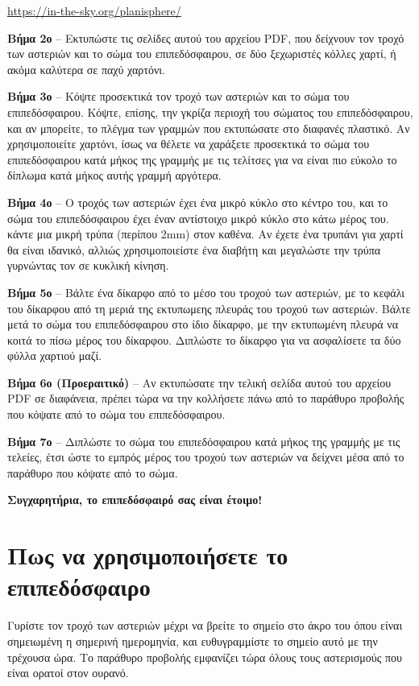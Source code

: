 \documentclass[a4paper,onecolumn,10pt]{article}
\begin{document}
\url{https://in-the-sky.org/planisphere/}

{\bf Βήμα 2ο} -- Εκτυπώστε τις σελίδες αυτού του αρχείου PDF, που δείχνουν τον
τροχό των αστεριών και το σώμα του επιπεδόσφαιρου, σε δύο ξεχωριστές κόλλες χαρτί,
ή ακόμα καλύτερα σε παχύ χαρτόνι.

{\bf Βήμα 3ο} -- Κόψτε προσεκτικά τον τροχό των αστεριών και το σώμα του
επιπεδόσφαιρου. Κόψτε, επίσης, την γκρίζα περιοχή του σώματος του επιπεδόσφαιρου, και
αν μπορείτε, το πλέγμα των γραμμών που εκτυπώσατε στο διαφανές πλαστικό. 
Αν χρησιμοποιείτε χαρτόνι, ίσως να θέλετε να χαράξετε προσεκτικά το σώμα
του επιπεδόσφαιρου κατά μήκος της γραμμής με τις τελίτσες για να είναι πιο εύκολο το δίπλωμα
κατά μήκος αυτής γραμμή αργότερα.

{\bf Βήμα 4ο} -- Ο τροχός των αστεριών έχει ένα μικρό κύκλο στο κέντρο του, και το σώμα 
του επιπεδόσφαιρου έχει έναν αντίστοιχο μικρό κύκλο στο κάτω μέρος του. κάντε μια μικρή τρύπα
(περίπου 2mm) στον καθένα. Αν έχετε ένα τρυπάνι για χαρτί θα είναι ιδανικό,
αλλιώς χρησιμοποιείστε ένα διαβήτη και μεγαλώστε την τρύπα γυρνώντας τον σε κυκλική κίνηση.

{\bf Βήμα 5ο} -- Βάλτε ένα δίκαρφο από το μέσο του τροχού των αστεριών, 
με το κεφάλι του δίκαρφου από τη μεριά της εκτυπωμεης πλευράς του τροχού των αστεριών. 
Βάλτε μετά το σώμα του επιπεδόσφαιρου στο ίδιο δίκαρφο, με την εκτυπωμένη πλευρά
να κοιτά το πίσω μέρος του δίκαρφου. Διπλώστε το δίκαρφο για να ασφαλίσετε τα 
δύο φύλλα χαρτιού μαζί.

{\bf Βήμα 6ο (Προεραιτικό)} -- Αν εκτυπώσατε την τελική σελίδα αυτού του αρχείου PDF
σε διαφάνεια, πρέπει τώρα να την κολλήσετε πάνω από το παράθυρο προβολής
που κόψατε από το σώμα του επιπεδόσφαιρου.

{\bf Βήμα 7ο} -- Διπλώστε το σώμα του επιπεδόσφαιρου κατά μήκος της γραμμής με τις τελείες,
έτσι ώστε το εμπρός μέρος του τροχού των αστεριών να δείχνει μέσα από το παράθυρο που κόψατε 
από το σώμα.

{\bf Συγχαρητήρια, το επιπεδόσφαιρό σας είναι έτοιμο!}

\section*{Πως να χρησιμοποιήσετε το επιπεδόσφαιρο}

Γυρίστε τον τροχό των αστεριών μέχρι να βρείτε το σημείο στο άκρο του όπου είναι σημειωμένη
η σημερινή ημερομηνία, και ευθυγραμμίστε το σημείο αυτό με την τρέχουσα ώρα. Το παράθυρο προβολής 
εμφανίζει τώρα όλους τους αστερισμούς που είναι ορατοί στον ουρανό.
\end{document}
